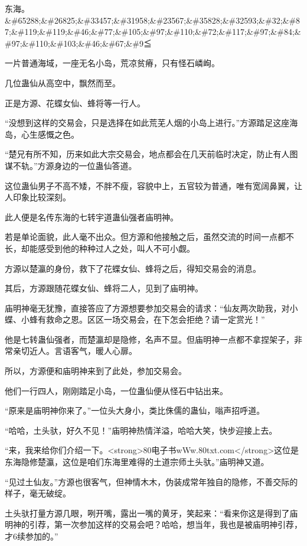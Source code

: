 
\begin{this_body}

东海。\&\#65288;\&\#26825;\&\#33457;\&\#31958;\&\#23567;\&\#35828;\&\#32593;\&\#32;\&\#87;\&\#119;\&\#119;\&\#46;\&\#77;\&\#105;\&\#97;\&\#110;\&\#72;\&\#117;\&\#97;\&\#84;\&\#97;\&\#110;\&\#103;\&\#46;\&\#67;\&\#9≦

一片普通海域，一座无名小岛，荒凉贫瘠，只有怪石嶙峋。

几位蛊仙从高空中，飘然而至。

正是方源、花蝶女仙、蜂将等一行人。

“没想到这样的交易会，只是选择在如此荒芜人烟的小岛上进行。”方源踏足这座海岛，心生感慨之色。

“楚兄有所不知，历来如此大宗交易会，地点都会在几天前临时决定，防止有人图谋不轨。”方源身边的一位蛊仙答道。

这位蛊仙男子不高不矮，不胖不瘦，容貌中上，五官较为普通，唯有宽阔鼻翼，让人印象比较深刻。

此人便是名传东海的七转宇道蛊仙强者庙明神。

若是单论面貌，此人毫不出众。但方源和他接触之后，虽然交流的时间一点都不长，却能感受到他的种种过人之处，叫人不可小觑。

方源以楚瀛的身份，救下了花蝶女仙、蜂将之后，得知交易会的消息。

其后，方源跟随花蝶女仙、蜂将二人，见到了庙明神。

庙明神毫无犹豫，直接答应了方源想要参加交易会的请求：“仙友两次助我，对小蝶、小蜂有救命之恩。区区一场交易会，在下怎会拒绝？请一定赏光！”

他是七转蛊仙强者，而楚瀛却是隐修，名声不显。但庙明神一点都不拿捏架子，非常亲切近人。言语客气，暖人心扉。

所以，方源便和庙明神来到了此处，参加交易会。

他们一行四人，刚刚踏足小岛，一位蛊仙便从怪石中钻出来。

“原来是庙明神你来了。”一位头大身小，类比侏儒的蛊仙，嗡声招呼道。

“哈哈，土头驮，好久不见！”庙明神热情洋溢，哈哈大笑，快步迎接上去。

“来，我来给你们介绍一下。<strong>80电子书wWw.80txt.com</strong>这位是东海隐修楚瀛，这位是咱们东海里难得的土道宗师土头驮。”庙明神又道。

“见过土仙友。”方源也很客气，但神情木木，伪装成常年独自的隐修，不善交际的样子，毫无破绽。

土头驮打量方源几眼，咧开嘴，露出一嘴的黄牙，笑起来：“看来你这是得到了庙明神的引荐，第一次参加这样的交易会吧？哈哈，想当年，我也是被庙明神引荐，才6续参加的。”


\end{this_body}
